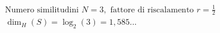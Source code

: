 \documentclass[preview]{standalone}
\begin{document}
\begin{align*}
&\text{Numero similitudini } N = 3, \text{ fattore di riscalamento } r = \frac{1}{2} \\ &\dim_H(S) = \log_{2}(3) = 1,585...
\end{align*}
\end{document}
